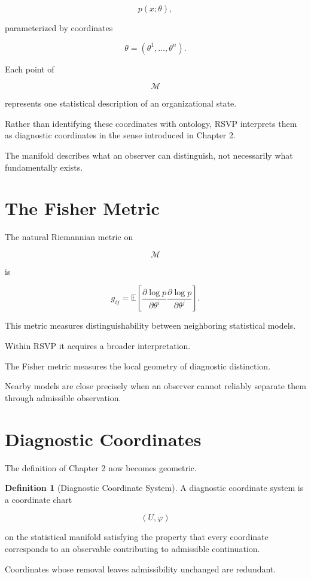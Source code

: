 \documentclass[11pt,oneside]{book}
\numberwithin{equation}{chapter}
\theoremstyle{definition}
\newtheorem{definition}{Definition}[chapter]
\theoremstyle{plain}
\begin{document}
\[
p(x;\theta),
\]

parameterized by coordinates

\[
\theta=(\theta^1,\ldots,\theta^n).
\]

Each point of

\[
\mathcal{M}
\]

represents one statistical description of an organizational state.

Rather than identifying these coordinates with ontology, RSVP interprets
them as diagnostic coordinates in the sense introduced in Chapter 2.

The manifold describes what an observer can distinguish, not necessarily
what fundamentally exists.

\section{The Fisher Metric}

The natural Riemannian metric on

\[
\mathcal M
\]

is

\[
g_{ij}
=
\mathbb E
\!\left[
\frac{\partial\log p}{\partial\theta^i}
\frac{\partial\log p}{\partial\theta^j}
\right].
\]

This metric measures distinguishability between neighboring statistical
models.

Within RSVP it acquires a broader interpretation.

The Fisher metric measures the local geometry of diagnostic distinction.

Nearby models are close precisely when an observer cannot reliably separate
them through admissible observation.

\section{Diagnostic Coordinates}

The definition of Chapter 2 now becomes geometric.

\begin{definition}[Diagnostic Coordinate System]

A diagnostic coordinate system is a coordinate chart

\[
(U,\varphi)
\]

on the statistical manifold satisfying the property that every coordinate
corresponds to an observable contributing to admissible continuation.

Coordinates whose removal leaves admissibility unchanged are redundant.

\end{definition}
\end{document}
